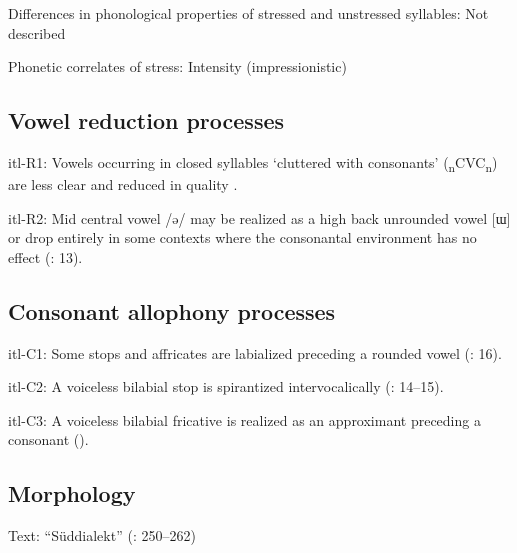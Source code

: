 {\begin{appendixdesc}
\item[Differences in phonological properties of stressed and unstressed syllables:] Not described

\item[Phonetic correlates of stress:] Intensity (impressionistic)
\end{appendixdesc}
\subsection*{Vowel reduction processes}
\begin{appendixdesc}

\item[itl-R1:] Vowels occurring in closed syllables ‘cluttered with consonants’ (\textsubscript{n}CVC\textsubscript{n}) are less clear and reduced in quality \citep[73]{Volodin1976}.

\item[itl-R2:] Mid central vowel /ə/ may be realized as a high back unrounded vowel [ɯ] or drop entirely in some contexts where the consonantal environment has no effect (\citealt{GeorgVolodin1999}: 13).
\end{appendixdesc}
\subsection*{Consonant allophony processes}
\begin{appendixdesc}

\item[itl-C1:] Some stops and affricates are labialized preceding a rounded vowel (\citealt{GeorgVolodin1999}: 16).

\item[itl-C2:] A voiceless bilabial stop is spirantized intervocalically (\citealt{GeorgVolodin1999}: 14--15).

\item[itl-C3:] A voiceless bilabial fricative is realized as an approximant preceding a consonant (\citealt{GeorgVolodin1999}).
\end{appendixdesc}
\subsection*{Morphology}

\begin{appendixdesc}

\item[Text:] “Süddialekt” (\citealt{GeorgVolodin1999}: 250--262)


\end{appendixdesc}}

